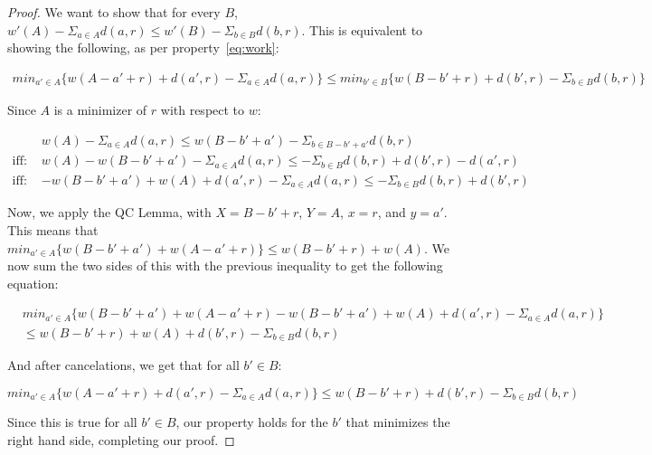 \begin{proof}
    We want to show that for every $B$, $w'(A) - \Sigma_{a \in A} d(a,r) \leq w'(B) - \Sigma_{b \in B} d(b,r)$. This is equivalent to showing the following, as per property~\ref{eq:work}:
    
    \begin{equation*}
        \begin{split}
            min_{a' \in A} \{ w(A - a' + r) + d(a', r) - \Sigma_{a \in A} d(a,r)\} \leq min_{b' \in B} \{ w(B - b' + r) + d(b', r) - \Sigma_{b \in B} d(b,r)\}
        \end{split}
    \end{equation*}

    Since $A$ is a minimizer of $r$ with respect to $w$:

    \begin{equation*}
        \begin{split}
            &w(A) - \Sigma_{a \in A} d(a,r) \leq w(B-b' + a') - \Sigma_{b \in B - b' + a'} d(b, r) \\
            \text{iff: } &w(A) - w(B-b' + a') - \Sigma_{a \in A} d(a,r) \leq -\Sigma_{b \in B} d(b, r) + d(b', r) - d(a', r) \\
            \text{iff: } &-w(B - b' + a') + w(A) + d(a', r) - \Sigma_{a \in A} d(a,r) \leq -\Sigma_{b \in B} d(b,r) + d(b', r)
        \end{split}
    \end{equation*}

    Now, we apply the QC Lemma, with $X = B -b' + r$, $Y = A$, $x = r$, and $y = a'$. This means that $min_{a' \in A} \{ w(B - b' + a') + w(A -a' + r)\} \leq w(B - b' + r) + w(A)$. We now sum the two sides of this with the previous inequality to get the following equation:

    \begin{equation*}
        \begin{split}
            &min_{a' \in A} \{ w(B - b' + a') + w(A -a' + r) - w(B - b' + a') + w(A) + d(a', r) - \Sigma_{a \in A} d(a, r)\} \\
            &\leq w(B - b' + r) + w(A) + d(b' ,r) - \Sigma_{b \in B} d(b, r)
        \end{split}
    \end{equation*}

    And after cancelations, we get that for all $b' \in B$:

    \begin{equation*}
        min_{a' \in A} \{ w(A - a' + r) + d(a', r) - \Sigma_{a \in A} d(a,r)\} \leq w(B - b' + r) + d(b', r) - \Sigma_{b \in B} d(b,r)
    \end{equation*}

    Since this is true for all $b' \in B$, our property holds for the $b'$ that minimizes the right hand side, completing our proof.
\end{proof}

